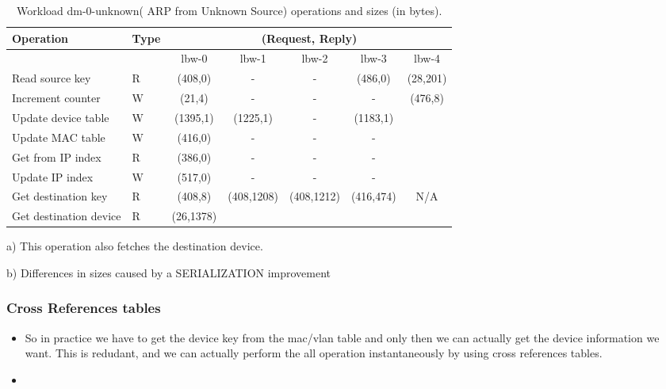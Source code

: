 
\begin{table}[ht]
\small
\centering 
\begin{threeparttable}
\begin{tabular}{ll ccccc}
 Operation & Type &  \multicolumn{5}{c}{ (Request, Reply) } \\  \midrule
&  & lbw-0 & lbw-1  & lbw-2 & lbw-3 & lbw-4 \\ \toprule 
Read source key & R & (408,0) & - & - & (486,0) & (28,201)\tnote{a}\\
Increment counter & W & (21,4) & -  & - & - & \multirow{5}{*}{(476,8)} \\
Update device table & W & (1395,1) & (1225,1)\tnote{b}  & - &
(1183,1) & \\
Update MAC  table & W & (416,0) & - & - & -
& \\
Get from IP index & R & (386,0) & - & - & - & \\
Update IP index  & W & (517,0) & - & - & - & \\
Get destination key & R & (408,8) &
\multirow{2}{*}{(408,1208)}\tnote{b} & \multirow{2}{*}{(408,1212)} &
\multirow{2}{*}{(416,474)} & \multirow{2}{*}{N/A}  \\ 
Get destination device & R & (26,1378)  &  & & \\\bottomrule
\end{tabular}
\caption[Workload dm-0-unknown( ARP from Unknown Source)
operations]{Workload dm-0-unknown( ARP from Unknown Source) operations
  and sizes (in bytes).}
\begin{tablenotes}
\item [a)] This operation also fetches the destination device.
\item [b)] Differences in sizes caused by a SERIALIZATION improvement 
\end{tablenotes}
\end{threeparttable}
\end{table}


\subsubsection{Cross References tables}
\begin{itemize}
\item So in practice we have to get the device key from the mac/vlan
  table and only then we can actually get the device information we
  want. This is redudant, and we can actually perform the all
  operation instantaneously  by using cross references tables. 

\item 
\end{itemize}




